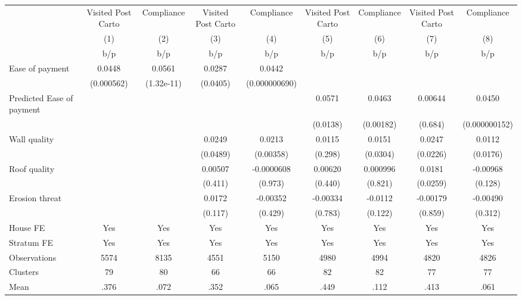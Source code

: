 {
\def\sym#1{\ifmmode^{#1}\else\(^{#1}\)\fi}
\begin{tabular}{l*{8}{c}}
\toprule
                &\multicolumn{1}{c}{Visited Post Carto}&\multicolumn{1}{c}{Compliance}&\multicolumn{1}{c}{Visited Post Carto}&\multicolumn{1}{c}{Compliance}&\multicolumn{1}{c}{Visited Post Carto}&\multicolumn{1}{c}{Compliance}&\multicolumn{1}{c}{Visited Post Carto}&\multicolumn{1}{c}{Compliance}\\
                &\multicolumn{1}{c}{(1)}&\multicolumn{1}{c}{(2)}&\multicolumn{1}{c}{(3)}&\multicolumn{1}{c}{(4)}&\multicolumn{1}{c}{(5)}&\multicolumn{1}{c}{(6)}&\multicolumn{1}{c}{(7)}&\multicolumn{1}{c}{(8)}\\
                &      b/p&      b/p&      b/p&      b/p&      b/p&      b/p&      b/p&      b/p\\
\midrule
Ease of payment &   0.0448&   0.0561&   0.0287&   0.0442&         &         &         &         \\
                &(0.000562)&(1.32e-11)& (0.0405)&(0.000000690)&         &         &         &         \\
Predicted Ease of payment&         &         &         &         &   0.0571&   0.0463&  0.00644&   0.0450\\
                &         &         &         &         & (0.0138)&(0.00182)&  (0.684)&(0.000000152)\\
Wall quality    &         &         &   0.0249&   0.0213&   0.0115&   0.0151&   0.0247&   0.0112\\
                &         &         & (0.0489)&(0.00358)&  (0.298)& (0.0304)& (0.0226)& (0.0176)\\
Roof quality    &         &         &  0.00507&-0.0000608&  0.00620& 0.000996&   0.0181& -0.00968\\
                &         &         &  (0.411)&  (0.973)&  (0.440)&  (0.821)& (0.0259)&  (0.128)\\
Erosion threat  &         &         &   0.0172& -0.00352& -0.00334&  -0.0112& -0.00179& -0.00490\\
                &         &         &  (0.117)&  (0.429)&  (0.783)&  (0.122)&  (0.859)&  (0.312)\\
House FE        &      Yes&      Yes&      Yes&      Yes&      Yes&      Yes&      Yes&      Yes\\
Stratum FE      &      Yes&      Yes&      Yes&      Yes&      Yes&      Yes&      Yes&      Yes\\
\midrule
Observations    &     5574&     8135&     4551&     5150&     4980&     4994&     4820&     4826\\
Clusters        &       79&       80&       66&       66&       82&       82&       77&       77\\
Mean            &     .376&     .072&     .352&     .065&     .449&     .112&     .413&     .061\\
\bottomrule
\end{tabular}
}

